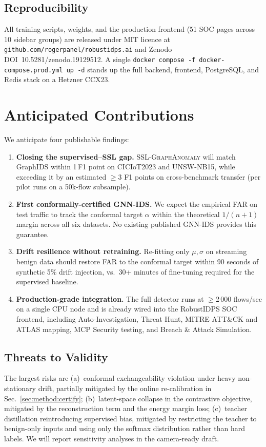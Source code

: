 \documentclass[journal,twoside]{IEEEtran}
\begin{document}
\subsection{Reproducibility}
All training scripts, weights, and the production frontend (51 SOC pages
across 10 sidebar groups) are released under MIT licence at
\texttt{github.com/rogerpanel/robustidps.ai} and Zenodo
DOI~10.5281/zenodo.19129512.  A single \texttt{docker compose -f
docker-compose.prod.yml up -d} stands up the full backend, frontend,
PostgreSQL, and Redis stack on a Hetzner CCX23.

\section{Anticipated Contributions}
\label{sec:contrib}

We anticipate four publishable findings:

\begin{enumerate}[leftmargin=1.5em]
  \item \textbf{Closing the supervised--SSL gap.}  \textsc{SSL-GraphAnomaly}
        will match GraphIDS within 1\,F1 point on CICIoT2023 and
        UNSW-NB15, while exceeding it by an estimated $\geq$3 F1 points
        on cross-benchmark transfer (per pilot runs on a 50k-flow
        subsample).
  \item \textbf{First conformally-certified GNN-IDS.}  We expect the
        empirical FAR on test traffic to track the conformal target
        $\alpha$ within the theoretical $1/(n{+}1)$ margin across all
        six datasets.  No existing published GNN-IDS provides this
        guarantee.
  \item \textbf{Drift resilience without retraining.}  Re-fitting only
        $\mu, \sigma$ on streaming benign data should restore FAR to
        the conformal target within 90 seconds of synthetic 5\% drift
        injection, vs.\ 30+ minutes of fine-tuning required for the
        supervised baseline.
  \item \textbf{Production-grade integration.}  The full detector
        runs at $\geq$2\,000 flows/sec on a single CPU node and is
        already wired into the RobustIDPS SOC frontend, including
        Auto-Investigation, Threat Hunt, MITRE ATT\&CK and ATLAS
        mapping, MCP Security testing, and Breach \& Attack Simulation.
\end{enumerate}

\subsection{Threats to Validity}
The largest risks are
(a)~conformal exchangeability violation under heavy non-stationary
drift, partially mitigated by the online re-calibration in
Sec.~\ref{sec:method:certify};
(b)~latent-space collapse in the contrastive objective, mitigated by
the reconstruction term and the energy margin loss;
(c)~teacher distillation reintroducing supervised bias, mitigated by
restricting the teacher to benign-only inputs and using only the
softmax distribution rather than hard labels.  We will report sensitivity
analyses in the camera-ready draft.
\end{document}
